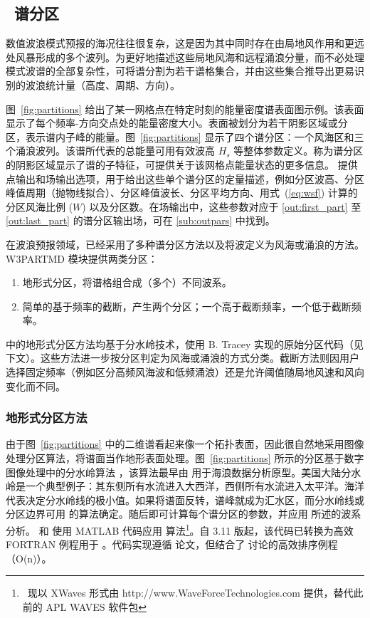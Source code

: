 \vssub
\subsection{~谱分区} \label{sub:num_part}

数值波浪模式预报的海况往往很复杂，这是因为其中同时存在由局地风作用和更远处风暴形成的多个波列。为更好地描述这些局地风海和远程涌浪分量，而不必处理模式波谱的全部复杂性，可将谱分割为若干谱格集合，并由这些集合推导出更易识别的波浪统计量（高度、周期、方向）。

\noindent
图~\ref{fig:partitions} 给出了某一网格点在特定时刻的能量密度谱表面图示例。该表面显示了每个频率-方向交点处的能量密度大小。表面被划分为若干阴影区域或分区，表示谱内子峰的能量。图~\ref{fig:partitions} 显示了四个谱分区：一个风海区和三个涌浪波列。该谱所代表的总能量可用有效波高 $H_s$ 等整体参数定义。称为谱分区的阴影区域显示了谱的子特征，可提供关于该网格点能量状态的更多信息。\ws{} 提供点输出和场输出选项，用于给出这些单个谱分区的定量描述，例如分区波高、分区峰值周期（抛物线拟合）、分区峰值波长、分区平均方向、用式~(\ref{eq:wsf}) 计算的分区风海比例 ($W$) 以及分区数。在场输出中，这些参数对应于 \ref{out:first_part} 至 \ref{out:last_part} 的谱分区输出场，可在 \para\ref{sub:outpars} 中找到。

在波浪预报领域，已经采用了多种谱分区方法以及将波定义为风海或涌浪的方法。W3PARTMD 模块提供两类分区：
\begin{enumerate}
  \item 地形式分区，将谱格组合成（多个）不同波系。
  \item 简单的基于频率的截断，产生两个分区；一个高于截断频率，一个低于截断频率。
\end{enumerate}
\ws{} 中的地形式分区方法均基于分水岭技术，使用 B. Tracey 实现的原始分区代码（见下文）。这些方法进一步按分区判定为风海或涌浪的方式分类。截断方法则因用户选择固定频率（例如区分高频风海波和低频涌浪）还是允许阈值随局地风速和风向变化而不同。

\subsubsection{地形式分区方法}

由于图~\ref{fig:partitions} 中的二维谱看起来像一个拓扑表面，因此很自然地采用图像处理分区算法，将谱面当作地形表面处理。图~\ref{fig:partitions} 所示的分区基于数字图像处理中的分水岭算法 \citep{art:VS91}，该算法最早由 \cite{pro:HJ04} 用于海浪数据分析原型。美国大陆分水岭是一个典型例子：其东侧所有水流进入大西洋，西侧所有水流进入太平洋。海洋代表决定分水岭线的极小值。如果将谱面反转，谱峰就成为汇水区，而分水岭线或分区边界可用 \cite{art:VS91} 的算法确定。随后即可计算每个谱分区的参数，并应用 \cite{art:HP01} 所述的波系分析。\cite{pro:HJ04} 和 \cite{tol:Vict06b} 使用 MATLAB 代码应用 \cite{art:VS91} 算法\footnote{~现以 XWaves 形式由 http://www.WaveForceTechnologies.com 提供，替代此前的 APL WAVES 软件包}。自 3.11 版起，该代码已转换为高效 FORTRAN 例程用于 \ws{}。代码实现遵循 \cite{art:VS91} 论文，但结合了 \cite{rep:TTH06} 讨论的高效排序例程（O(n)）。

